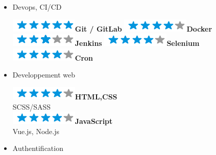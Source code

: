 \documentclass[]{friggeri-cv}
\begin{document}
\begin{flushleft}
\begin{multicols}{3}
\begin{itemize}
\columnbreak
\item \large Devops, CI/CD \
\normalsize
\begin{flushleft}

\includegraphics[scale=0.40]{res/img/5stars.png}\hspace{1.5mm}\textbf{Git / GitLab}
\includegraphics[scale=0.40]{res/img/4stars.png}\hspace{1.5mm}\textbf{Docker}
\includegraphics[scale=0.40]{res/img/3stars.png}\hspace{1.5mm}\textbf{Jenkins}
\includegraphics[scale=0.40]{res/img/4stars.png}\hspace{1.5mm}\textbf{Selenium}
\includegraphics[scale=0.40]{res/img/4stars.png}\hspace{1.5mm}\textbf{Cron}
\end{flushleft}            

\item \large Developpement web \
\normalsize
\begin{flushleft}

\includegraphics[scale=0.40]{res/img/4stars.png}\hspace{1.5mm}\textbf{HTML,CSS}\\SCSS/SASS\\
\includegraphics[scale=0.40]{res/img/4stars.png}\hspace{1.5mm}\textbf{JavaScript}\\Vue.js, Node.js\\
\end{flushleft}            

\item \large Authentification \
\normalsize
\begin{flushleft}


\end{flushleft}
\end{itemize}
\end{multicols}
\end{flushleft}
\end{document}
